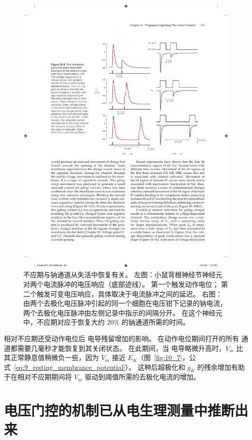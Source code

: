 \begin{figure}[htbp]
	\centering
	\includegraphics[width=0.85\linewidth]{chap10/fig_10_8}
	\caption{不应期与钠通道从失活中恢复有关。
		左图：小鼠背根神经节神经元对两个电流脉冲的电压响应（底部迹线）。
		第一个触发动作电位；
		第二个触发可变电压响应，具体取决于电流脉冲之间的延迟。
		右图：由两个去极化电压脉冲引起的同一个细胞在电压钳下记录的钠电流，两个去极化电压脉冲由左侧记录中指示的间隔分开。
		在这个神经元中，不应期对应于恢复大约 20\% 的钠通道所需的时间。}
	\label{fig:10_8}
\end{figure}


相对不应期还受动作电位后  电导残留增加的影响。
在动作电位期间打开的所有  通道都需要几毫秒才能恢复到其关闭状态。
在此期间，当  电导略微升高时，$V_m$ 比其正常静息值稍微负一些，因为 $V_m$ 接近 $E_K$（图~\ref{fig:10_7}，公式~\ref{eq:9_resting_membrance_potential}）。
这种后超极化和 $g_K$ 的残余增加有助于在相对不应期期间将 $V_m$ 驱动到阈值所需的去极化电流的增加。




\section{电压门控的机制已从电生理测量中推断出来}

